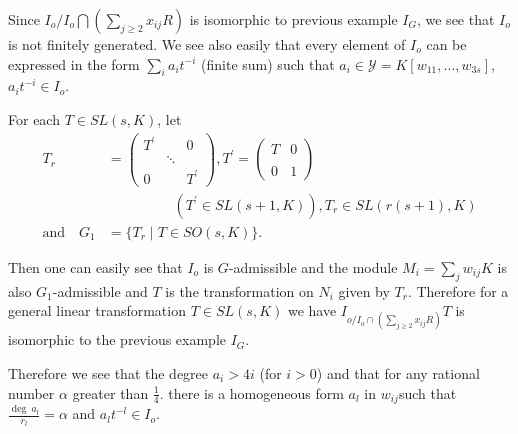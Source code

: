  Since $I_o / I_o \bigcap (\underset{j\ge 2}{\sum} x_{ij}R)$ is
 isomorphic to previous example $I_G$, we see that $I_o$ is not
 finitely generated. We see also easily that every element of $I_o$
 can be expressed in the form $\sum\limits_i a_i t^{-i}$ (finite sum)
 such that $a_i \in \mathscr{Y}= K [w_{11}, \dots , w_{3s}]$, $a_i
 t^{-i} \in I_o$. 
 
 For each $T \in SL (s, K)$, let 
\begin{align*}
  T_r & = 
  \begin{pmatrix} 
    T^{\prime} & & 0\\ & \ddots & \\  0 & & T^{\prime} 
  \end{pmatrix} , T^{\prime} = 
  \begin{pmatrix} 
   T & 0\\ \\ 0 & 1 
  \end{pmatrix}\\ 
  & \hspace{2cm}(T^{\prime} \in SL (s+1, K)), T_r \in SL(r(s+1),K)\\
  \text{and}\quad  G_1 & = \bigg\{ T_r \mid T \in
 SO (s, K) \bigg\}. 
\end{align*}

Then one can easily see that $ I_o$ is
 $G$-admissible and the module $ M_i = \sum\limits_{j} w_{ij} K$ is also $
 G_1$-admissible and $T$ is the transformation on $N_i$ given by
 $T_r$. Therefore for a general linear transformation $T \in SL (s,
 K)$ we have $I_{o/I_o \cap (\sum\limits_{j \ge 2} x_{ij}R)} T$ is
 isomorphic to the previous example $ I_G$. 
 
 Therefore we see that the degree $a_i > 4i$ (for $i >
 0$) and that for any rational number $\alpha$ greater than
 $\frac{1}{4}$. there is a homogeneous form $a_l$ in 
$w_{ij}$\pageoriginale such that $\frac{\deg ~ a_l}{r_l}= \alpha$ and
 $a_l t^{-l}\in I_o$.  
 
